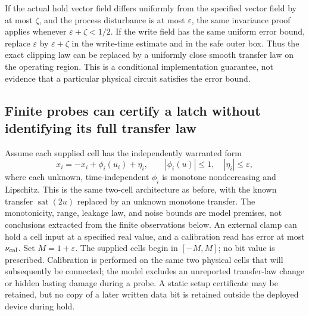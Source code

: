 \documentclass[11pt]{article}
\theoremstyle{definition}
\theoremstyle{remark}
\newcommand{\sat}{\operatorname{sat}}
\begin{document}
If the actual hold vector field differs uniformly from the specified vector field by at most $\zeta$, and the process disturbance is at most $\varepsilon$, the same invariance proof applies whenever $\varepsilon+\zeta<1/2$. If the write field has the same uniform error bound, replace $\varepsilon$ by $\varepsilon+\zeta$ in the write-time estimate and in the safe outer box. Thus the exact clipping law can be replaced by a uniformly close smooth transfer law on the operating region. This is a conditional implementation guarantee, not evidence that a particular physical circuit satisfies the error bound.

\subsection{Finite probes can certify a latch without identifying its full transfer law}
Assume each supplied cell has the independently warranted form
\[
 \dot x_i=-x_i+\phi_i(u_i)+\eta_i,
 \qquad |\phi_i(u)|\leq1,\quad |\eta_i|\leq\varepsilon,
\]
where each unknown, time-independent $\phi_i$ is monotone nondecreasing and Lipschitz. This is the same two-cell architecture as before, with the known transfer $\sat(2u)$ replaced by an unknown monotone transfer. The monotonicity, range, leakage law, and noise bounds are model premises, not conclusions extracted from the finite observations below. An external clamp can hold a cell input at a specified real value, and a calibration read has error at most $\nu_{\rm cal}$. Set $M=1+\varepsilon$. The supplied cells begin in $[-M,M]$; no bit value is prescribed. Calibration is performed on the same two physical cells that will subsequently be connected; the model excludes an unreported transfer-law change or hidden lasting damage during a probe. A static setup certificate may be retained, but no copy of a later written data bit is retained outside the deployed device during hold.
\end{document}
